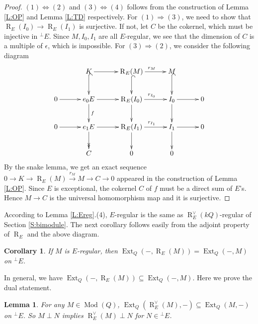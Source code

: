 \documentclass{amsart}
\newtheorem{lemma}[theorem]{Lemma}
\newtheorem{corollary}[theorem]{Corollary}
\theoremstyle{definition}
\theoremstyle{remark}
\numberwithin{equation}{section}
\begin{document}
\begin{proof} $(1)\Leftrightarrow (2)$ and $(3)\Leftrightarrow(4)$ follows from the construction of Lemma \ref{L:OP} and Lemma \ref{L:TD} respectively.
For $(1)\Rightarrow(3)$, we need to show that ${\operatorname{R}}_E(I_0)\to {\operatorname{R}}_E(I_1)$ is surjective. If not, let $C$ be the cokernel, which must be injective in $^\perp E$. Since $M,I_0,I_1$ are all $E$-regular, we see that the dimension of $C$ is a multiple of $\epsilon$, which is impossible. For $(3)\Rightarrow(2)$, we consider the following diagram
$$\xymatrix @C=2.5pc {
& K \ar@{^{(}->}[d] \ar[r] & {\operatorname{R}}_E(M) \ar@{^{(}->}[d] \ar[r]^{r_M} & M  \ar@{^{(}->}[d] \\
0 \ar[r] & e_0E^{} \ar[r]^{} \ar[d]^{f} & {\operatorname{R}}_E(I_0) \ar[r]^{r_{I_0}} \ar[d]^{} & I_0 \ar[d]^{} \ar[r] & 0\\
0 \ar[r] & e_1E^{} \ar[r] \ar@{->>}[d] &  {\operatorname{R}}_E(I_1) \ar[r]^{r_{I_1}} \ar[d] &  I_1 \ar[r] \ar[d] & 0 \\
& C & 0 & 0
}$$
By the snake lemma, we get an exact sequence $0\to K \to {\operatorname{R}}_E(M)\xrightarrow{r_M} M\to C\to 0$ appeared in the construction of Lemma \ref{L:OP}. Since $E$ is exceptional, the cokernel $C$ of $f$ must be a direct sum of $E$'s. Hence $M\to C$ is the universal homomorphism map and it is surjective.
\end{proof}

According to Lemma \ref{L:Ereg}.(4), $E$-regular is the same as ${\operatorname{R}}_E^\vee(kQ)$-regular of Section \ref{S:bimodule}. The next corollary follows easily from the adjoint property of ${\operatorname{R}}_E$ and the above diagram.

\begin{corollary}
If $M$ is $E$-regular, then ${\operatorname{Ext}}_{Q}(-,{\operatorname{R}}_E(M))={\operatorname{Ext}}_Q(-,M)$ on $^\perp E$.
\end{corollary}

In general, we have ${\operatorname{Ext}}_{Q}(-,{\operatorname{R}}_E(M))\subseteq {\operatorname{Ext}}_Q(-,M)$. Here we prove the dual statement.
\begin{lemma} \label{L:proj_ss} For any $M\in{\operatorname{Mod}}(Q)$, ${\operatorname{Ext}}_{Q}({\operatorname{R}}_{E}^\vee(M),-)\subseteq{\operatorname{Ext}}_Q(M,-)$ on ${{^\perp}\!} E$. So $M\perp N$ implies ${\operatorname{R}}_{E}^\vee(M)\perp N$ for $N\in {{^\perp}\!} E$.
\end{lemma}
\end{document}
